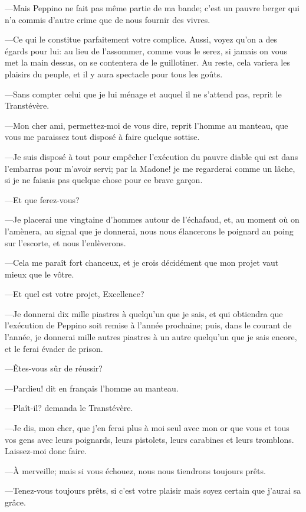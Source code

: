 —Mais Peppino ne fait pas même partie de ma bande; c'est un pauvre berger qui n'a commis d'autre crime que de nous fournir des vivres. 

—Ce qui le constitue parfaitement votre complice. Aussi, voyez qu'on a des égards pour lui: au lieu de l'assommer, comme vous le serez, si jamais on vous met la main dessus, on se contentera de le guillotiner. Au reste, cela variera les plaisirs du peuple, et il y aura spectacle pour tous les goûts. 

—Sans compter celui que je lui ménage et auquel il ne s'attend pas, reprit le Transtévère. 

—Mon cher ami, permettez-moi de vous dire, reprit l'homme au manteau, que vous me paraissez tout disposé à faire quelque sottise. 

—Je suis disposé à tout pour empêcher l'exécution du pauvre diable qui est dans l'embarras pour m'avoir servi; par la Madone! je me regarderai comme un lâche, si je ne faisais pas quelque chose pour ce brave garçon. 

—Et que ferez-vous? 

—Je placerai une vingtaine d'hommes autour de l'échafaud, et, au moment où on l'amènera, au signal que je donnerai, nous nous élancerons le poignard au poing sur l'escorte, et nous l'enlèverons. 

—Cela me paraît fort chanceux, et je crois décidément que mon projet vaut mieux que le vôtre. 

—Et quel est votre projet, Excellence? 

—Je donnerai dix mille piastres à quelqu'un que je sais, et qui obtiendra que l'exécution de Peppino soit remise à l'année prochaine; puis, dans le courant de l'année, je donnerai mille autres piastres à un autre quelqu'un que je sais encore, et le ferai évader de prison. 

—Êtes-vous sûr de réussir? 

—Pardieu! dit en français l'homme au manteau. 

—Plaît-il? demanda le Transtévère. 

—Je dis, mon cher, que j'en ferai plus à moi seul avec mon or que vous et tous vos gens avec leurs poignards, leurs pistolets, leurs carabines et leurs tromblons. Laissez-moi donc faire. 

—À merveille; mais si vous échouez, nous nous tiendrons toujours prêts. 

—Tenez-vous toujours prêts, si c'est votre plaisir mais soyez certain que j'aurai sa grâce. 

